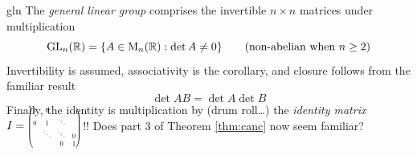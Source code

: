 \begin{example}{}{gln}
	The \emph{general linear group} comprises the invertible $n\times n$ matrices under multiplication
	\[
		\mathrm{GL}_n(\mathbb{R})=\{A\in \mathrm{M}_n(\mathbb{R}):\det A\neq 0\} \tag{non-abelian when $n\ge 2$}
	\]
	Invertibility is assumed, associativity is the corollary, and closure follows from the familiar result
	\[
		\det AB=\det A\det B
	\]
	Finally, the identity is multiplication by (drum roll\ldots) the \emph{identity matrix} $I=\smash{\scalebox{0.6}{%
	$\begin{pmatrix}
		1&0&&\\
		0&1&\ddots&\\
		&\ddots&\ddots&0\\
		&&0&1
	\end{pmatrix}$%
	}}$!!\smallbreak
	Does part 3 of Theorem \ref{thm:canc} now seem familiar?
\end{example}



\vfil

